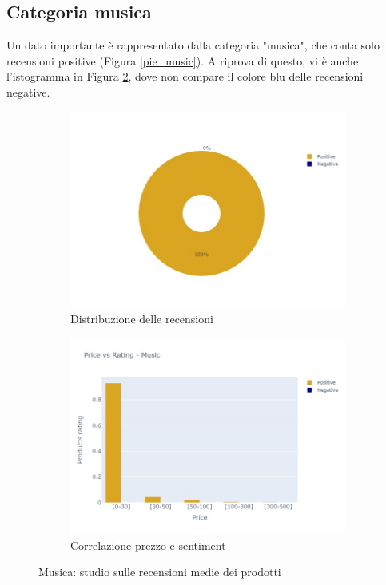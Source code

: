 		
		\subsection{Categoria musica}
			Un dato importante è rappresentato dalla categoria "musica", che conta solo recensioni positive (Figura \ref{pie_music}). A riprova di questo, vi è anche l'istogramma in Figura \ref{fig:priceVSrating_music}, dove non compare il colore blu delle recensioni negative. 
				
			\begin{figure} [h]
				\centering
				\begin{subfigure}{0.48\textwidth}
					\includegraphics[width=\textwidth]{Figure/pie_music}
					\caption{Distribuzione delle recensioni}
					\label{fig:pie_music}
				\end{subfigure}
				\begin{subfigure}{0.48\textwidth}
					\includegraphics[width=\textwidth]{Figure/priceVSrating_music}
					\caption{Correlazione prezzo e sentiment}
					\label{fig:priceVSrating_music}
				\end{subfigure}
				\caption{Musica: studio sulle recensioni medie dei prodotti}\label{fig:price_raiting_music}
			\end{figure}
		
		
		